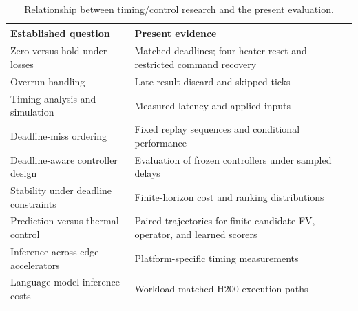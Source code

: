 \begin{table}[tbp]
\centering
\caption{Relationship between timing/control research and the present evaluation.}
\label{tab:position}
\footnotesize
\setlength{\tabcolsep}{3pt}
\begin{tabularx}{\linewidth}{@{}YY@{}}
\toprule
Established question & Present evidence\\
\midrule
Zero versus hold under losses\supercite{schenato2009} & Matched deadlines; four-heater reset and restricted command recovery\\
Overrun handling\supercite{cervin2005} & Late-result discard and skipped ticks\\
Timing analysis and simulation\supercite{cervin2003} & Measured latency and applied inputs\\
Deadline-miss ordering\supercite{pazzaglia2018} & Fixed replay sequences and conditional performance\\
Deadline-aware controller design\supercite{pazzaglia2019} & Evaluation of frozen controllers under sampled delays\\
Stability under deadline constraints\supercite{maggio2020} & Finite-horizon cost and ranking distributions\\
Prediction versus thermal control\supercite{halilovic2026} & Paired trajectories for finite-candidate FV, operator, and learned scorers\\
Inference across edge accelerators\supercite{jeong2026} & Platform-specific timing measurements\\
Language-model inference costs\supercite{shin2024} & Workload-matched H200 execution paths\\
\bottomrule
\end{tabularx}
\end{table}

